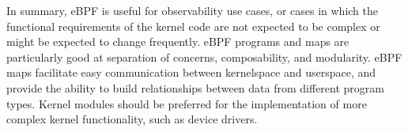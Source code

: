 In summary, eBPF is useful for observability use cases, or cases in which the functional
requirements of the kernel code are not expected to be complex or might be expected to
change frequently. eBPF programs and maps are particularly good at separation of concerns,
composability, and modularity. eBPF maps facilitate easy communication between kernelspace
and userspace, and provide the ability to build relationships between data from different
program types. Kernel modules should be preferred for the implementation of more complex
kernel functionality, such as device drivers.
